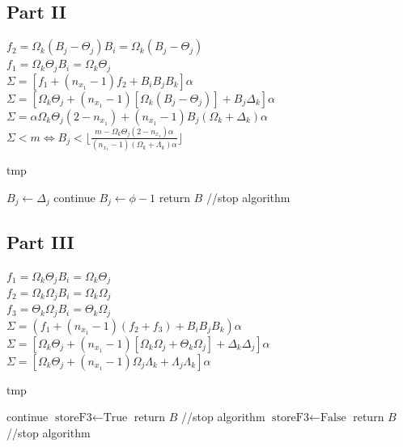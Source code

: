 \documentclass[conference]{IEEEtran}
\begin{document}
  \subsection{Part II}
  \noindent $f_2 = \Omega_k (B_j - \Theta_j)B_i = \Omega_k(B_j - \Theta_j)$ \\
  $f_1 = \Omega_k\Theta_jB_i = \Omega_k\Theta_j $ \\
  $\Sigma = [f_1 + (n_{x_1} - 1)f_2 + B_iB_jB_k]\alpha$ \\
  $\Sigma = [\Omega_k\Theta_j + (n_{x_1}-1)[\Omega_k(B_j -\Theta_j)] + B_j\Delta_k]\alpha$ \\
  $\Sigma = \alpha\Omega_k\Theta_j(2-n_{x_1})+(n_{x_1}-1)B_j(\Omega_k+\Delta_k)\alpha$ \\
  $\Sigma < m \Leftrightarrow B_j < \lfloor \frac{m - \Omega_k\Theta_j(2-n_{x_1})\alpha}{(n_{x_1}-1)(\Omega_k+\Lambda_k)\alpha} \rfloor $

  \begin{algorithm}[h]
    \caption{tmp}
    \begin{algorithmic}[1]
      \STATE $B_j \leftarrow \Delta_j$
      \STATE continue
    \ELSE
      \STATE $B_j \leftarrow \phi - 1$
      \STATE return $B$ //stop algorithm
    \ENDIF
    \end{algorithmic}
  \end{algorithm}

  \subsection{Part III}
  \noindent $f_1 = \Omega_k \Theta_j B_i = \Omega_k \Theta_j $ \\
  $f_2 = \Omega_k \Omega_j B_i = \Omega_k \Omega_j $ \\
  $f_3 = \Theta_k \Omega_j B_i = \Theta_k \Omega_j $ \\

  \noindent $\Sigma = (f_1 + (n_{x_1} - 1)(f_2 + f_3) + B_iB_jB_k)\alpha$
  $\Sigma = [ \Omega_k\Theta_j + (n_{x_1} - 1)[\Omega_k \Omega_j + \Theta_k \Omega_j] + \Delta_k\Delta_j]\alpha$ \\
  $\Sigma = [\Omega_k\Theta_j + (n_{x_1}-1)\Omega_j\Lambda_k + \Lambda_j\Lambda_k]\alpha$

  \begin{algorithm}[h]
    \caption{tmp}
    \begin{algorithmic}[1]
      \STATE continue
      \STATE $\textrm{storeF3} \leftarrow \textrm{True}$
      \STATE return $B$ //stop algorithm
    \ELSE
      \STATE $\textrm{storeF3} \leftarrow \textrm{False}$
      \STATE return $B$ //stop algorithm
    \ENDIF
    \end{algorithmic}
  \end{algorithm}
\end{document}
